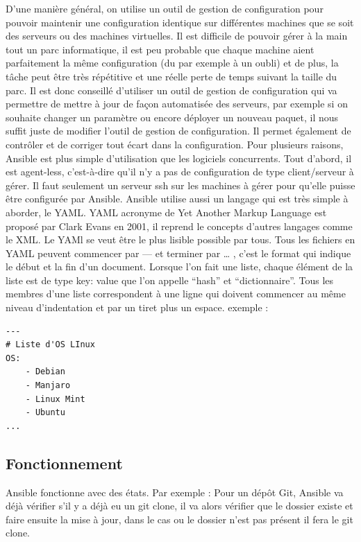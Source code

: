 \documentclass[]{article}
\begin{document}
D'une manière général, on utilise un outil de gestion de configuration
pour pouvoir maintenir une configuration identique sur différentes
machines que se soit des serveurs ou des machines virtuelles. Il est
difficile de pouvoir gérer à la main tout un parc informatique, il est
peu probable que chaque machine aient parfaitement la même configuration
(du par exemple à un oubli) et de plus, la tâche peut être très
répétitive et une réelle perte de temps suivant la taille du parc. Il
est donc conseillé d'utiliser un outil de gestion de configuration qui
va permettre de mettre à jour de façon automatisée des serveurs, par
exemple si on souhaite changer un paramètre ou encore déployer un
nouveau paquet, il nous suffit juste de modifier l'outil de gestion de
configuration. Il permet également de contrôler et de corriger tout
écart dans la configuration. Pour plusieurs raisons, Ansible est plus
simple d'utilisation que les logiciels concurrents. Tout d'abord, il est
agent-less, c'est-à-dire qu'il n'y a pas de configuration de type
client/serveur à gérer. Il faut seulement un serveur ssh sur les
machines à gérer pour qu'elle puisse être configurée par Ansible.
Ansible utilise aussi un langage qui est très simple à aborder, le YAML.
YAML acronyme de Yet Another Markup Language est proposé par Clark Evans
en 2001, il reprend le concepts d'autres langages comme le XML. Le YAMl
se veut être le plus lisible possible par tous. Tous les fichiers en
YAML peuvent commencer par --- et terminer par \ldots{} , c'est le
format qui indique le début et la fin d'un document. Lorsque l'on fait
une liste, chaque élément de la liste est de type \og
key: value \fg que l'on appelle ``hash'' et
``dictionnaire''. Tous les membres d'une liste correspondent à une ligne
qui doivent commencer au même niveau d'indentation et par un tiret plus
un espace. exemple :
\begin{verbatim}
---
# Liste d'OS LInux
OS:
	- Debian
	- Manjaro
	- Linux Mint
	- Ubuntu
...
\end{verbatim}


\subsection{Fonctionnement}\label{fonctionnement-1}

Ansible fonctionne avec des états.
Par exemple :
Pour un dépôt Git, Ansible va déjà vérifier s'il y a déjà eu un git clone, il va alors vérifier que le dossier existe et faire ensuite la mise à jour, dans le cas ou le dossier n'est pas présent il fera le git clone.
\end{document}

